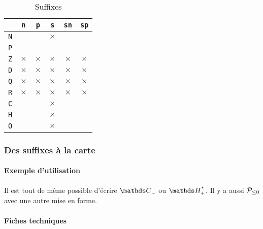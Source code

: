 \documentclass[12pt,a4paper]{article}
\theoremstyle{definition}
\begin{document}
\newcommand\xx{\phantom{$\times$}}
\begin{table}[h]
    \caption{Suffixes}
    \begin{center}
        \begin{tabular}{c|c|c|c|c|c}
              & \verb+n+ & \verb+p+ & \verb+s+ & \verb+sn+ & \verb+sp+ \\
            \hline \verb+N+ & \xx & \xx & $\times$ & \xx & \xx \\
            \hline \verb+P+ & \xx & \xx & \xx & \xx & \xx \\
            \hline \verb+Z+ & $\times$ & $\times$ & $\times$ & $\times$ & $\times$ \\
            \hline \verb+D+ & $\times$ & $\times$ & $\times$ & $\times$ & $\times$ \\
            \hline \verb+Q+ & $\times$ & $\times$ & $\times$ & $\times$ & $\times$ \\
            \hline \verb+R+ & $\times$ & $\times$ & $\times$ & $\times$ & $\times$ \\
            \hline \verb+C+ & \xx & \xx & $\times$ & \xx & \xx \\
            \hline \verb+H+ & \xx & \xx & $\times$ & \xx & \xx \\
            \hline \verb+O+ & \xx & \xx & $\times$ & \xx & \xx \\
        \end{tabular}
    \end{center}
    \label{table:suffixes-sets}
\end{table}




        \subsubsection{Des suffixes à la carte}

            \paragraph{Exemple d'utilisation}

\begin{tcblisting}{}
Il est tout de même possible d'écrire $\specialset{\CC}{n}$ ou $\specialset{\HH}{sp}$.
Il y a aussi $\specialset*{\probaset{P}}{n}$ avec une autre mise en forme.
\end{tcblisting}


            \paragraph{Fiches techniques}
\end{document}
